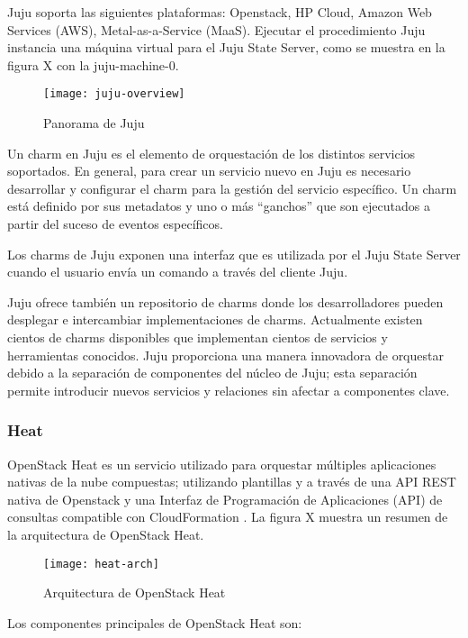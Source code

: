 Juju soporta las siguientes plataformas: Openstack, HP Cloud, Amazon Web Services (AWS), Metal-as-a-Service (MaaS). Ejecutar el procedimiento Juju instancia una máquina virtual  para el Juju State Server, como se muestra en la figura X con la juju-machine-0.


\begin{figure}[H]
    \centering
    \texttt{[image: juju-overview]}
    \caption{ Panorama de Juju \parencite{Metsch2013-et}}
    \label{fig:juju-overview}
\end{figure}

Un charm en Juju es el elemento de orquestación de los distintos servicios soportados. En general, para crear un servicio nuevo en Juju es necesario desarrollar y configurar el charm para la gestión del servicio específico. Un charm está definido por sus metadatos y uno o más “ganchos” que son ejecutados a partir del suceso de eventos específicos. 

Los charms de Juju exponen una interfaz que es utilizada por el Juju State Server cuando el usuario envía un comando a través del cliente Juju. 

Juju ofrece también un repositorio de charms donde los desarrolladores pueden desplegar e intercambiar implementaciones de charms. Actualmente existen cientos de charms disponibles que implementan cientos de servicios y herramientas conocidos. Juju proporciona una manera innovadora de orquestar debido a la separación de componentes del núcleo de Juju; esta separación permite introducir nuevos servicios y relaciones sin afectar a componentes clave.


\subsubsection{Heat}

OpenStack Heat es un servicio utilizado para orquestar múltiples aplicaciones nativas de la nube compuestas; utilizando plantillas y a través de una API REST nativa de Openstack y una Interfaz de Programación de Aplicaciones (API) de consultas compatible con CloudFormation \parencite{Rackspace2016-jh}. La figura X muestra un resumen de la arquitectura de OpenStack Heat.
\begin{figure}[h!]
    \centering
    \texttt{[image: heat-arch]}
    \caption{ Arquitectura de OpenStack Heat \parencite{Metsch2013-et}}
    \label{fig:heat-arch}
\end{figure}
Los componentes principales de OpenStack Heat son:

